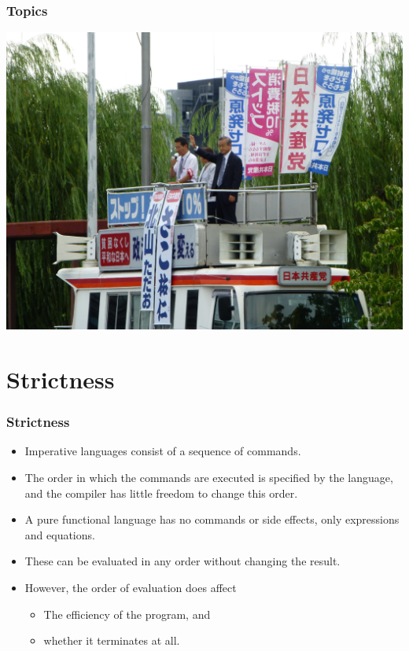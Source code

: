\documentclass{beamer}
\begin{document}
\begin{frame}[fragile]
  \PresentationTitleSlide
\end{frame}

\begin{frame}[fragile]
  \frametitle{Topics}
  \tableofcontents
\end{frame}
\begin{frame}[fragile]
\begin{center}
\includegraphics[scale=0.475]
    {figures/jpg/pic11.jpg}
\end{center}
\end{frame}
\section{Strictness}

\begin{frame}[fragile]
\frametitle{Strictness}

\begin{itemize}
\item Imperative languages consist of a sequence of commands.
\item The order in which the commands are executed is specified by
  the language, and the compiler has little freedom to change this
  order.
\item A pure functional language has no commands or side effects,
  only expressions and equations.
\item These can be evaluated in any order without changing the
  result.
\item However, the order of evaluation does affect
  \begin{itemize}
  \item The efficiency of the program, and
  \item whether it terminates at all.
  \end{itemize}
\end{itemize}

\end{frame}
\end{document}
